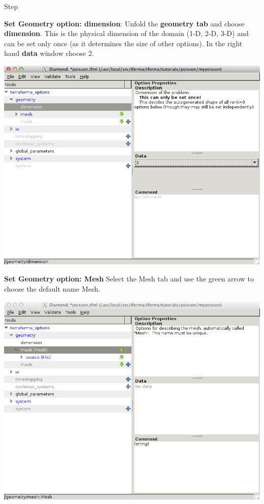 \begin{steps}{Step}
\item\textbf{ Set Geometry option: dimension}: Unfold the
  \textbf{geometry tab} and choose \textbf{dimension}.  This is the
  physical dimension of the domain (1-D, 2-D, 3-D) and can be set only
  once (as it determines the size of other options).  In the right
  hand \textbf{data} window choose 2.
\begin{center}
  \includegraphics[width=\diamondwidth]{figures/screendumps/diamond_poisson_02a.png}    
  \end{center}

\item \textbf{Set Geometry option: Mesh} Select the Mesh tab and
  use the green arrow to choose the default name Mesh.  
  \begin{center}
    \includegraphics[width=\diamondwidth]{figures/screendumps/diamond_poisson_03a.png}
  \end{center}


\end{steps}
